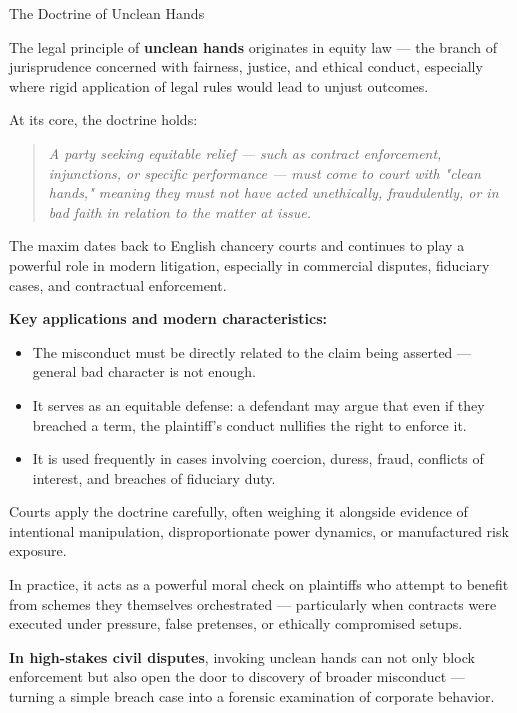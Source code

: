 \begin{HistoricalSidebar}{The Doctrine of Unclean Hands}

    The legal principle of \textbf{unclean hands} originates in equity law — the branch of jurisprudence concerned with fairness, justice, and ethical conduct, especially where rigid application of legal rules would lead to unjust outcomes.
    
    \medskip
    
    At its core, the doctrine holds:
    
    \begin{quote}
        \textit{A party seeking equitable relief — such as contract enforcement, injunctions, or specific performance — must come to court with "clean hands," meaning they must not have acted unethically, fraudulently, or in bad faith in relation to the matter at issue.}
    \end{quote}
    
    The maxim dates back to English chancery courts and continues to play a powerful role in modern litigation, especially in commercial disputes, fiduciary cases, and contractual enforcement.
    
    \medskip
    
    \textbf{Key applications and modern characteristics:}
    
    \begin{itemize}
        \item The misconduct must be directly related to the claim being asserted — general bad character is not enough.
        \item It serves as an equitable defense: a defendant may argue that even if they breached a term, the plaintiff’s conduct nullifies the right to enforce it.
        \item It is used frequently in cases involving coercion, duress, fraud, conflicts of interest, and breaches of fiduciary duty.
    \end{itemize}
    
    \medskip
    
    Courts apply the doctrine carefully, often weighing it alongside evidence of intentional manipulation, disproportionate power dynamics, or manufactured risk exposure.

    \medskip
    
    In practice, it acts as a powerful moral check on plaintiffs who attempt to benefit from schemes they themselves orchestrated — particularly when contracts were executed under pressure, false pretenses, or ethically compromised setups.
    
    \medskip
    
    \textbf{In high-stakes civil disputes}, invoking unclean hands can not only block enforcement but also open the door to discovery of broader misconduct — turning a simple breach case into a forensic examination of corporate behavior.
    
\end{HistoricalSidebar}

